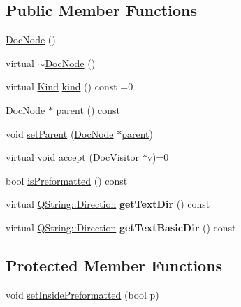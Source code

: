 \subsection*{Public Member Functions}
\begin{DoxyCompactItemize}
\item 
\mbox{\hyperlink{class_doc_node_a98d902adedf9b2270a6673e59dbab89e}{Doc\+Node}} ()
\item 
virtual \mbox{\hyperlink{class_doc_node_a024e5ba89b140e83416f9f85f5f6d036}{$\sim$\+Doc\+Node}} ()
\item 
virtual \mbox{\hyperlink{class_doc_node_aebd16e89ca590d84cbd40543ea5faadb}{Kind}} \mbox{\hyperlink{class_doc_node_a108ffd214a72ba6e93dac084a8f58049}{kind}} () const =0
\item 
\mbox{\hyperlink{class_doc_node}{Doc\+Node}} $\ast$ \mbox{\hyperlink{class_doc_node_a73e8ad29a91cfceb0968eb00db71a23d}{parent}} () const
\item 
void \mbox{\hyperlink{class_doc_node_a2855de7ff1248fdb71e579087ae56098}{set\+Parent}} (\mbox{\hyperlink{class_doc_node}{Doc\+Node}} $\ast$\mbox{\hyperlink{class_doc_node_a73e8ad29a91cfceb0968eb00db71a23d}{parent}})
\item 
virtual void \mbox{\hyperlink{class_doc_node_a5303a550cbe6395663bf9b9dad28cbf1}{accept}} (\mbox{\hyperlink{class_doc_visitor}{Doc\+Visitor}} $\ast$v)=0
\item 
bool \mbox{\hyperlink{class_doc_node_a79d0b2250794ae96a629d964f60cb2a4}{is\+Preformatted}} () const
\item 
\mbox{\label{class_doc_node_a5a9cb1f89177537eafca7bbb2159df06}} 
virtual \mbox{\hyperlink{class_q_string_acaff43b133319ea651f19aac6b967406}{Q\+String\+::\+Direction}} {\bfseries get\+Text\+Dir} () const
\item 
\mbox{\label{class_doc_node_ac2bfc174fc1a34cc8eacf51e318a329b}} 
virtual \mbox{\hyperlink{class_q_string_acaff43b133319ea651f19aac6b967406}{Q\+String\+::\+Direction}} {\bfseries get\+Text\+Basic\+Dir} () const
\end{DoxyCompactItemize}
\subsection*{Protected Member Functions}
\begin{DoxyCompactItemize}
\item 
void \mbox{\hyperlink{class_doc_node_a7059408f429dc1358764e334079ca986}{set\+Inside\+Preformatted}} (bool p)
\end{DoxyCompactItemize}
